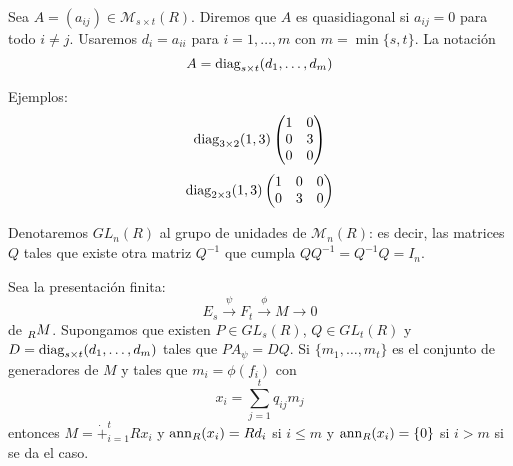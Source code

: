 \begin{df}
  Sea \(A=(a_{ij})\in\mathcal{M}_{s\times t}(R)\). Diremos que
  \(A\) es quasidiagonal si \(a_{ij}=0\) para todo \(i\neq j\).
  Usaremos \(d_i=a_{ii}\) para \(i=1,\ldots,m\) con
  \(m=\min\{s,t\}\). La notación
  \[
    A=\operatorname{diag}_{s\times t}(d_1,\ldots, d_m)
  \]
\end{df}

Ejemplos:
\[
  \operatorname{diag}_{3\times 2}(1,3)
  \begin{pmatrix}
    1&0\\
    0&3\\
    0&0
  \end{pmatrix}
\]
\[
  \operatorname{diag}_{2\times 3}(1,3)
  \begin{pmatrix}
    1&0&0\\
    0&3&0\\
  \end{pmatrix}
\]

\begin{nt}
  Denotaremos \(GL_n(R)\) al grupo de unidades de \(\mathcal{M}_n(R)\):
  es decir, las matrices \(Q\) tales que existe
  otra matriz \(Q^{-1}\) que cumpla \(QQ^{-1}=Q^{-1}Q=I_n\).
\end{nt}

\begin{prop}
  Sea la presentación finita:
  \[
    E_s\overset{\psi}{\longrightarrow} F_t
    \overset{\phi}{\longrightarrow} M\longrightarrow 0
  \]
  de \(\prescript{}{R}{M}\). Supongamos que existen \(P\in GL_s(R)\),
  \(Q\in GL_t(R)\) y \\\(D=\operatorname{diag}_{s\times t}(d_1,\ldots, d_m)\)
  tales que \(PA_\psi = DQ\). Si \(\{m_1,\ldots, m_t\}\) es el conjunto
  de generadores de \(M\) y tales que \(m_i=\phi(f_i)\) con
  \[
    x_i=\sum_{j=1}^t q_{ij}m_j
  \]
  entonces \(M=\dot{+}_{i=1}^t Rx_i\) y \(\operatorname{ann}_R(x_i)=Rd_i\) si
  \(i\le m\) y \(\operatorname{ann}_R(x_i)=\{0\}\) si \(i>m\) si se da el caso.
\end{prop}

